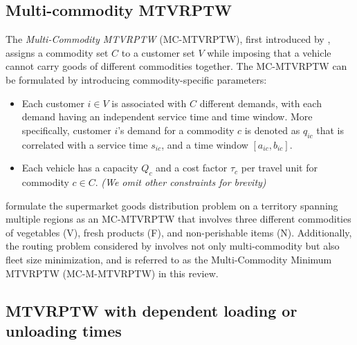 \subsection{Multi-commodity MTVRPTW}
The \textit{Multi-Commodity MTVRPTW} (MC-MTVRPTW), first introduced by \cite{battarra2009adaptive}, assigns a commodity set $C$ to a customer set $V$ while imposing that a vehicle cannot carry goods of different commodities together.  The MC-MTVRPTW can be formulated by introducing commodity-specific parameters:

\begin{itemize}
    \item Each customer $i \in V$ is associated with $C$ different demands, with each demand having an independent service time and time window.  More specifically, customer $i$'s demand for a commodity $c$ is denoted as $q_{ic}$ that is correlated with a service time $s_{ic}$, and a time window $[a_{ic},b_{ic}]$.
    \item Each vehicle has a capacity $Q_c$ and a cost factor $\tau_c$ per travel unit for commodity $c \in C$.
    \newline
    \textit{(We omit other constraints for brevity)}
\end{itemize}

\cite{battarra2009adaptive} formulate the supermarket goods distribution problem on a territory spanning multiple regions as an MC-MTVRPTW that involves three different commodities of vegetables (V), fresh products (F), and non-perishable items (N).  Additionally, the routing problem considered by \cite{battarra2009adaptive} involves not only multi-commodity but also fleet size minimization, and is referred to as the Multi-Commodity Minimum MTVRPTW (MC-M-MTVRPTW) in this review.

\subsection{MTVRPTW with dependent loading or unloading times}


